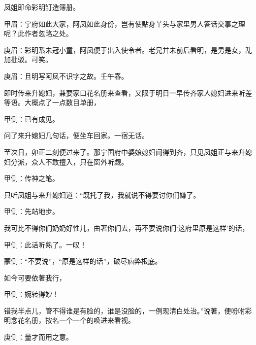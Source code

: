 \begin{parag}
    凤姐即命彩明钉造簿册。\begin{note}甲眉：宁府如此大家，阿凤如此身份，岂有使贴身丫头与家里男人答话交事之理呢？此作者忽略之处。\end{note}\begin{note}庚眉：彩明系未冠小童，阿凤便于出入使令者。老兄并未前后看明，是男是女，乱加批驳。可笑。\end{note}\begin{note}庚眉：且明写阿凤不识字之故。壬午春。\end{note}即时传来升媳妇，兼要家口花名册来查看，又限于明日一早传齐家人媳妇进来听差等语。大概点了一点数目单册，\begin{note}甲侧：已有成见。\end{note}问了来升媳妇几句话，便坐车回家。一宿无话。
\end{parag}


\begin{parag}
    至次日，卯正二刻便过来了。那宁国府中婆娘媳妇闻得到齐，只见凤姐正与来升媳妇分派，众人不敢擅入，只在窗外听觑。\begin{note}甲侧：传神之笔。\end{note}只听凤姐与来升媳妇道：“既托了我，我就说不得要讨你们嫌了。\begin{note}甲侧：先站地步。\end{note}我可比不得你们奶奶好性儿，由著你们去，再不要说你们‘这府里原是这样’的话，\begin{note}甲侧：此话听熟了。一叹！\end{note}\begin{note}蒙侧：“不要说”，“原是这样的话”，破尽痼弊根底。\end{note}如今可要依著我行，\begin{note}甲侧：婉转得妙！\end{note}错我半点儿，管不得谁是有脸的，谁是没脸的，一例现清白处治。”说著，便吩咐彩明念花名册，按名一个一个的唤进来看视。\begin{note}庚侧：量才而用之意。\end{note}
\end{parag}



